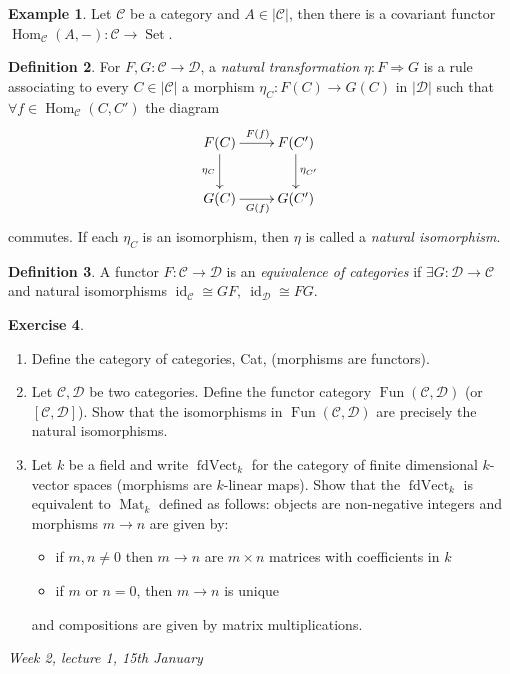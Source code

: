 \documentclass{article}
\newcommand{\id}{\operatorname{id}}
\newcommand{\Fun}{\operatorname{Fun}}
\newcommand{\Hom}{\operatorname{Hom}}
\newcommand{\Set}{\operatorname{Set}}
\newcommand{\ca}{\mathcal{C}}
\newcommand{\da}{\mathcal{D}}
\theoremstyle{definition}
\newtheorem{defn}{Definition}[subsection]
\newtheorem{example}[defn]{Example}
\newtheorem{exe}[defn]{Exercise}
\begin{document}
\begin{example}
Let $\ca$ be a category and $A\in|\ca|$, then there is a covariant functor $\Hom_\ca(A,-):\ca\rightarrow\Set$.
\end{example}

\begin{defn}
For $F,G:\ca\rightarrow\da$, a \textit{natural transformation} $\eta:F\Rightarrow G$ is a rule associating to every $C\in|\ca|$ a morphism $\eta_C:F(C)\rightarrow G(C)$ in $|\da|$ such that $\forall f\in\Hom_\ca(C,C')$ the diagram
\[
\xymatrix{
F(C)\ar[r]^{F(f)} \ar[d]_{\eta_C} & F(C')\ar[d]^{\eta_{C'}} \\
G(C)\ar[r]_{G(f)} & G(C')
}
\]
commutes. If each $\eta_C$ is an isomorphism, then $\eta$ is called a \textit{natural isomorphism}.
\end{defn}

\begin{defn}
A functor $F:\ca\rightarrow\da$ is an \textit{equivalence of categories} if $\exists G:\da\rightarrow\ca$ and natural isomorphisms $\id_\ca\cong GF,\ \id_\da\cong FG$.
\end{defn}

\begin{exe}
\begin{enumerate}
\item Define the category of categories, Cat, (morphisms are functors).
\item Let $\ca,\da$ be two categories. Define the functor category $\Fun(\ca,\da)$ (or $[\ca,\da]$). Show that the isomorphisms in $\Fun(\ca,\da)$ are precisely the natural isomorphisms.
\item Let $k$ be a field and write $\operatorname{fdVect}_k$ for the category of finite dimensional $k$-vector spaces (morphisms are $k$-linear maps). Show that the $\operatorname{fdVect}_k$ is equivalent to $\operatorname{Mat}_k$ defined as follows: objects are non-negative integers and morphisms $m\rightarrow n$ are given by:
\begin{itemize}
\item if $m,n\neq 0$ then $m\rightarrow n$ are $m\times n$ matrices with coefficients in $k$
\item if $m$ or $n=0$, then $m\rightarrow n$ is unique
\end{itemize}
and compositions are given by matrix multiplications.
\end{enumerate}
\end{exe}

\begin{flushright}
\textit{Week 2, lecture 1, 15th January}
\end{flushright}
\end{document}
